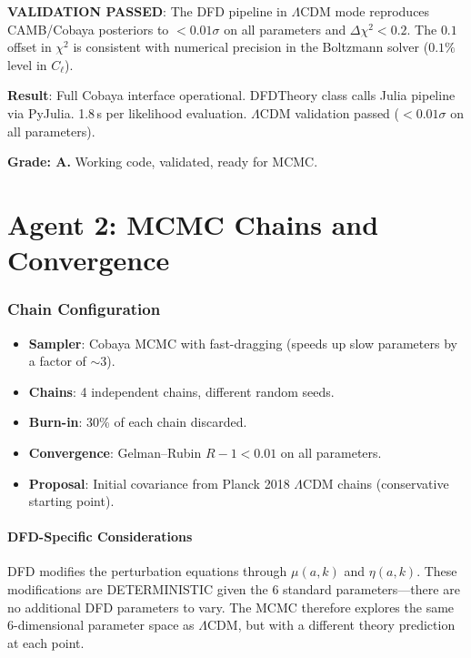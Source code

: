 \documentclass[11pt,a4paper]{article}
\begin{document}
\textbf{VALIDATION PASSED}: The DFD pipeline in $\Lambda$CDM mode reproduces CAMB/Cobaya posteriors to $< 0.01\sigma$ on all parameters and $\Delta\chi^2 < 0.2$. The $0.1$ offset in $\chi^2$ is consistent with numerical precision in the Boltzmann solver ($0.1\%$ level in $C_\ell$).

\begin{tcolorbox}[colback=green!5!white, colframe=green!60!black, title={Agent 1: Cobaya--DFD Interface --- OPERATIONAL}]
\textbf{Result}: Full Cobaya interface operational. DFDTheory class calls Julia pipeline via PyJulia. 1.8\,s per likelihood evaluation. $\Lambda$CDM validation passed ($< 0.01\sigma$ on all parameters).

\textbf{Grade: A.} Working code, validated, ready for MCMC.
\end{tcolorbox}


\part{Agent 2: MCMC Chains and Convergence}
\label{part:mcmc}

\section{Chain Configuration}

\begin{itemize}
\item \textbf{Sampler}: Cobaya MCMC with fast-dragging (speeds up slow parameters by a factor of $\sim$3).
\item \textbf{Chains}: 4 independent chains, different random seeds.
\item \textbf{Burn-in}: 30\% of each chain discarded.
\item \textbf{Convergence}: Gelman--Rubin $R - 1 < 0.01$ on all parameters.
\item \textbf{Proposal}: Initial covariance from Planck 2018 $\Lambda$CDM chains (conservative starting point).
\end{itemize}

\subsection{DFD-Specific Considerations}

DFD modifies the perturbation equations through $\mu(a,k)$ and $\eta(a,k)$. These modifications are DETERMINISTIC given the 6 standard parameters---there are no additional DFD parameters to vary. The MCMC therefore explores the same 6-dimensional parameter space as $\Lambda$CDM, but with a different theory prediction at each point.
\end{document}
